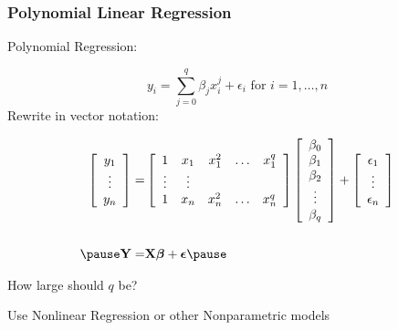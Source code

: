 \documentclass[]{beamer}
\begin{document}
\begin{frame} \frametitle{Polynomial Linear Regression}
Polynomial  Regression:

$$y_i = \sum_{j = 0}^q \beta_j x_i^j + \epsilon_i \text{  for  } i = 1, \ldots, n$$
\pause
Rewrite in vector  notation:

\begin{eqnarray*}
\left[
\begin{array}{c}  y_1 \\ \vdots \\  y_n \end{array} 
  \right]   =  & 
 \left[ \begin{array}{ccccc}  1 &  x_1 & x_1^2 & \ldots & x^q_1  \\
     \vdots & \vdots \\ 1 & x_n & x_n^2 & \ldots & x_n^q\end{array}  \right]   
 \left[ \begin{array}{c}  \beta_0  \\  \beta_1 \\ \beta_2 \\ \vdots \\ \beta_q \end{array}
 \right] + 
\left[ \begin{array}{c}  \epsilon_1 \\ \vdots \\ \epsilon_n  \end{array}
\right] \\
 & \\ \pause
\Y = & \X \b + \eps \pause
\end{eqnarray*}

How large should $q$ be?    \pause 

Use Nonlinear Regression  or other Nonparametric models

\end{frame}
\end{document}
